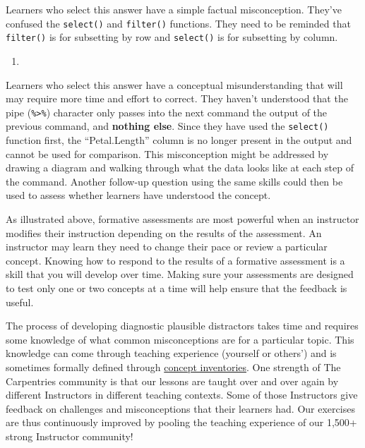 \documentclass[]{book}
\newenvironment{Shaded}{\begin{snugshade}}{\end{snugshade}}
\newcommand{\FloatTok}[1]{\textcolor[rgb]{0.00,0.00,0.81}{#1}}
\newcommand{\KeywordTok}[1]{\textcolor[rgb]{0.13,0.29,0.53}{\textbf{#1}}}
\newcommand{\NormalTok}[1]{#1}
\newcommand{\OperatorTok}[1]{\textcolor[rgb]{0.81,0.36,0.00}{\textbf{#1}}}
\newcommand{\StringTok}[1]{\textcolor[rgb]{0.31,0.60,0.02}{#1}}
\begin{document}
Learners who select this answer have a simple factual misconception. They've confused the
\texttt{select()} and \texttt{filter()} functions. They need to be reminded that \texttt{filter()} is for
subsetting by row and \texttt{select()} is for subsetting by column.

\begin{enumerate}
\def\labelenumi{\alph{enumi}.}
\setcounter{enumi}{2}
\item
\end{enumerate}

\begin{Shaded}
\end{Shaded}

Learners who select this answer have a conceptual misunderstanding that will may require more
time and effort to correct. They haven't understood that the pipe (\texttt{\%\textgreater{}\%}) character only
passes into the next command the output of the previous command, and \textbf{nothing else}. Since
they have used the \texttt{select()} function first, the ``Petal.Length'' column is no longer present
in the output and cannot be used for comparison. This misconception might be addressed by
drawing a diagram and walking through what the data looks like at each step of the command.
Another follow-up question using the same skills could then be used to assess whether learners
have understood the concept.

As illustrated above, formative assessments are most powerful when an instructor modifies their
instruction depending on the
results of the assessment. An instructor may learn they need to change their pace or review a
particular concept.
Knowing how to respond to the results of a formative assessment is a skill that you will develop
over time. Making sure your assessments are designed to test only one or two concepts at a time
will help ensure that the feedback is useful.

The process of developing diagnostic plausible distractors takes time and requires some
knowledge of what common
misconceptions are for a particular topic. This knowledge can come through teaching experience
(yourself or others') and is sometimes formally defined through \href{}{concept inventories}.
One strength of The Carpentries community is that our lessons are taught over and over again
by different Instructors in different teaching contexts. Some of those Instructors give
feedback on challenges and misconceptions that their learners had. Our exercises are thus
continuously improved by pooling the teaching experience of our 1,500+ strong Instructor
community!
\end{document}

